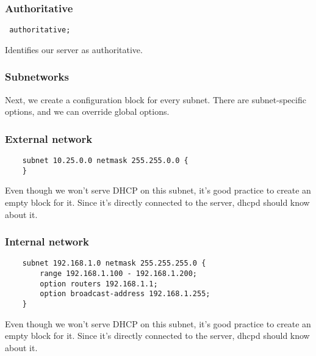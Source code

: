 \documentclass[10pt]{beamer}
\begin{document}
\begin{frame}
  \frametitle{Authoritative}
  
  \texttt{ authoritative; }
 
  Identifies our server as authoritative.

\end{frame}

\begin{frame}
  \frametitle{Subnetworks}
 
  Next, we create a configuration block for every subnet.  There are subnet-specific options, and we can override global options.
\end{frame}


\begin{frame}[fragile]
  \frametitle{External network}
  \begin{verbatim}
    subnet 10.25.0.0 netmask 255.255.0.0 {
    }
  \end{verbatim}  

  Even though we won't serve DHCP on this subnet, it's good practice to 
  create an empty block for it.  Since it's directly connected to the server,
  dhcpd should know about it.

\end{frame}


\begin{frame}[fragile]
  \frametitle{Internal network}
  \begin{verbatim}
    subnet 192.168.1.0 netmask 255.255.255.0 {
        range 192.168.1.100 - 192.168.1.200;
        option routers 192.168.1.1;
        option broadcast-address 192.168.1.255;
    }
  \end{verbatim}  

  Even though we won't serve DHCP on this subnet, it's good practice to 
  create an empty block for it.  Since it's directly connected to the server,
  dhcpd should know about it.

\end{frame}
\end{document}
